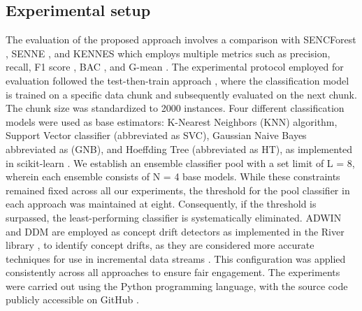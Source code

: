 \subsection{Experimental setup}
The evaluation of the proposed approach involves a comparison with SENCForest \cite{mu2017classification}, SENNE \cite{yang2021concept}, and KENNES \cite{zhang2022knnens} which employs multiple metrics such as precision, recall, F1 score \cite{sasaki2007truth}, BAC \cite{brodersen2010balanced}, and G-mean \cite{kubat1997addressing}. The experimental protocol employed for evaluation followed the test-then-train approach \cite{krawczyk2017ensemble}, where the classification model is trained on a specific data chunk and subsequently evaluated on the next chunk. The chunk size was standardized to 2000 instances. Four different classification models were used as base estimators: K-Nearest Neighbors (KNN) algorithm, Support Vector classifier (abbreviated as SVC), Gaussian Naive Bayes abbreviated as (GNB), and Hoeffding Tree (abbreviated as HT), as implemented in scikit-learn \cite{ksieniewicz2022stream}. We establish an ensemble classifier pool with a set limit of L = 8, wherein each ensemble consists of N = 4 base models. While these constraints remained fixed across all our experiments, the threshold for the pool classifier in each approach was maintained at eight. Consequently, if the threshold is surpassed, the least-performing classifier is systematically eliminated. ADWIN \cite{adams2023explainable} and DDM \cite{gama2004learning} are employed as concept drift detectors as implemented in the River library , to identify concept drifts, as they are considered more accurate techniques for use in incremental data streams \cite{gama2004learning}\cite{adams2023explainable}\cite{madkour2023historical}\cite{baena2006early}. This configuration was applied consistently across all approaches to ensure fair engagement. The experiments were carried out using the Python programming language, with the source code publicly accessible on GitHub . 
